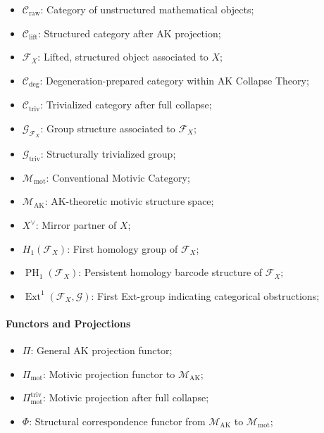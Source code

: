 \documentclass[11pt]{article}
\DeclareMathOperator{\Ext}{Ext}
\DeclareMathOperator{\PH}{PH}
\begin{document}
\begin{itemize}
    \item $\mathcal{C}_{\mathrm{raw}}$: Category of unstructured mathematical objects;
    \item $\mathcal{C}_{\mathrm{lift}}$: Structured category after AK projection;
    \item $\mathcal{F}_X$: Lifted, structured object associated to $X$;
    \item $\mathcal{C}_{\mathrm{deg}}$: Degeneration-prepared category within AK Collapse Theory;
    \item $\mathcal{C}_{\mathrm{triv}}$: Trivialized category after full collapse;
    \item $\mathcal{G}_{\mathcal{F}_X}$: Group structure associated to $\mathcal{F}_X$;
    \item $\mathcal{G}_{\mathrm{triv}}$: Structurally trivialized group;
    \item $\mathcal{M}_{\mathrm{mot}}$: Conventional Motivic Category;
    \item $\mathcal{M}_{\mathrm{AK}}$: AK-theoretic motivic structure space;
    \item $X^\vee$: Mirror partner of $X$;
    \item $H_1(\mathcal{F}_X)$: First homology group of $\mathcal{F}_X$;
    \item $\PH_1(\mathcal{F}_X)$: Persistent homology barcode structure of $\mathcal{F}_X$;
    \item $\Ext^1(\mathcal{F}_X, \mathcal{G})$: First Ext-group indicating categorical obstructions;
\end{itemize}

\paragraph{Functors and Projections}

\begin{itemize}
    \item $\Pi$: General AK projection functor;
    \item $\Pi_{\mathrm{mot}}$: Motivic projection functor to $\mathcal{M}_{\mathrm{AK}}$;
    \item $\Pi_{\mathrm{mot}}^{\mathrm{triv}}$: Motivic projection after full collapse;
    \item $\Phi$: Structural correspondence functor from $\mathcal{M}_{\mathrm{AK}}$ to $\mathcal{M}_{\mathrm{mot}}$;
\end{itemize}
\end{document}
